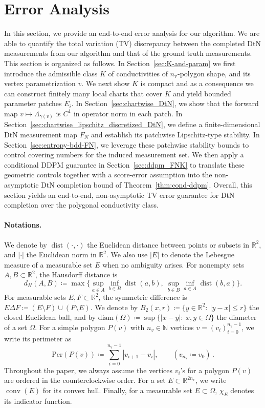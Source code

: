 \documentclass{article}
\newcommand{\R}{\mathbb{R}}
\newcommand{\conv}{\operatorname{conv}}
\newcommand{\Per}{\mathrm{Per}}
\newcommand{\diam}{\mathrm{diam}}
\newcommand{\dist}{\operatorname{dist}}
\begin{document}
\section{Error Analysis}\label{sec:theory}
In this section, we provide an end-to-end error analysis for our algorithm. We are able to quantify the total variation (TV) discrepancy between the completed DtN measurements from our algorithm and that of the ground truth measurements. 
This section is organized as follows. In Section~\ref{sec:K-and-param} we first introduce the admissible class \(K\) of conductivities of $n_{\mathrm{v}}$-polygon shape, and its vertex parametrization $v$. 
We next show $K$ is compact and as a consequence we can construct finitely many local charts that cover \(K\) and yield bounded parameter patches $E_i$. 
In Section~\ref{sec:chartwise_DtN}, we show that the forward map \(v\mapsto\Lambda_{\gamma(v)}\) is \(C^1\) in operator norm in each patch. In Section~\ref{sec:chartwise_lipschitz_discretized_DtN}, we define a finite-dimensional DtN measurement map $F_N$ and establish its patchwise Lipschitz-type stability. In Section~\ref{sec:entropy-bdd-FN}, we leverage these patchwise stability bounds to control covering numbers for the induced measurement set. We then apply a conditional DDPM guarantee in Section~\ref{sec:ddpm_FNK} to translate these geometric controls together with a score-error assumption into the non-asymptotic DtN completion bound of Theorem~\ref{thm:cond-ddpm}. Overall, this section yields an end-to-end, non-asymptotic TV error guarantee for DtN completion over the polygonal conductivity class.

\paragraph{Notations.}
We denote by 
$\dist(\cdot,\cdot)$ the Euclidean distance between points or subsets in $\mathbb{R}^2$, and $|\cdot|$ the Euclidean norm in $\mathbb{R}^2$. 
We also use $|E|$ to denote the Lebesgue measure of a measurable set $E$ when no ambiguity arises.
For nonempty sets $A,B\subset\R^2$, the Hausdorff distance is  
\[
d_H(A,B)\coloneqq \max\Big\{\sup_{a\in A} \inf_{b \in B}\dist(a,b),\ \sup_{b\in B} \inf_{a \in A} \dist(b,a)\Big\}.
\]
For measurable sets $E,F\subset\R^2$, the symmetric difference is
$E\Delta F\coloneqq (E\setminus F)\cup(F\setminus E)$. We denote by $B_2(x,r)\coloneqq \{y\in\R^2:\ |y-x|\le r\}$ the closed Euclidean ball, and by
$\diam(\Omega)\coloneqq \sup\{|x-y|:\ x,y\in\Omega\}$ the diameter of a set $\Omega$.
For a simple polygon $P(v)$ with $n_v\in \mathbb{N}$ vertices $v=(v_i)_{i=0}^{n_{\mathrm v}-1}$, we write its perimeter as
\[
\Per(P(v))\coloneqq \sum_{i=0}^{n_{\mathrm v}-1}|v_{i+1}-v_i|,\qquad (v_{n_{\mathrm v}}\coloneqq  v_0)\,.
\]
Throughout the paper, we always assume the vertices $v_i$'s for a polygon $P(v)$ are ordered in the counterclockwise order.
For a set $E\subset\R^{2n_{\mathrm v}}$, we write $\conv(E)$ for its convex hull.
Finally, for a measurable set $E\subset\Omega$, $\chi_{E}$ denotes its indicator function.
\end{document}
